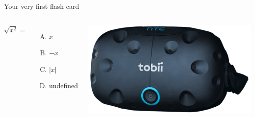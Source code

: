 \documentclass{beamer}
\begin{document}
\begin{frame}{Your very first flash card} \vspace{10pt}
    \begin{columns}[onlytextwidth]
        $\sqrt{x^2}=$ \\ [10pt]
            \begin{enumerate}[(A)]
            \item $x$
            \item $-x$
            \item $|x|$
            \item undefined
            \end{enumerate}
        \includegraphics[width = \textwidth]{Introducao/VIVE.png}
    \end{columns}    
\end{frame}
\end{document}
